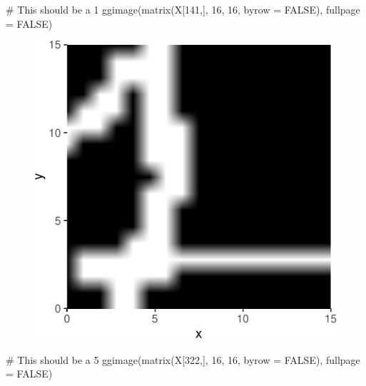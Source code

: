 \documentclass[
  letterpaper,
  DIV=11,
  numbers=noendperiod]{scrreprt}
\newenvironment{Shaded}{\begin{snugshade}}{\end{snugshade}}
\newcommand{\AttributeTok}[1]{\textcolor[rgb]{0.40,0.45,0.13}{#1}}
\newcommand{\CommentTok}[1]{\textcolor[rgb]{0.37,0.37,0.37}{#1}}
\newcommand{\ConstantTok}[1]{\textcolor[rgb]{0.56,0.35,0.01}{#1}}
\newcommand{\DecValTok}[1]{\textcolor[rgb]{0.68,0.00,0.00}{#1}}
\newcommand{\FunctionTok}[1]{\textcolor[rgb]{0.28,0.35,0.67}{#1}}
\newcommand{\NormalTok}[1]{\textcolor[rgb]{0.00,0.23,0.31}{#1}}
\begin{document}
\begin{Shaded}
\begin{Highlighting}[]
\CommentTok{\# This should be a 1}
\FunctionTok{ggimage}\NormalTok{(}\FunctionTok{matrix}\NormalTok{(X[}\DecValTok{141}\NormalTok{,], }\DecValTok{16}\NormalTok{, }\DecValTok{16}\NormalTok{, }\AttributeTok{byrow =} \ConstantTok{FALSE}\NormalTok{), }\AttributeTok{fullpage =} \ConstantTok{FALSE}\NormalTok{)}
\end{Highlighting}
\end{Shaded}

\begin{figure}[H]

{\centering \includegraphics{./11-SVD_PCA_files/figure-pdf/unnamed-chunk-13-2.pdf}

}

\end{figure}

\begin{Shaded}
\begin{Highlighting}[]
\CommentTok{\# This should be a 5}
\FunctionTok{ggimage}\NormalTok{(}\FunctionTok{matrix}\NormalTok{(X[}\DecValTok{322}\NormalTok{,], }\DecValTok{16}\NormalTok{, }\DecValTok{16}\NormalTok{, }\AttributeTok{byrow =} \ConstantTok{FALSE}\NormalTok{), }\AttributeTok{fullpage =} \ConstantTok{FALSE}\NormalTok{)}
\end{Highlighting}
\end{Shaded}
\end{document}
